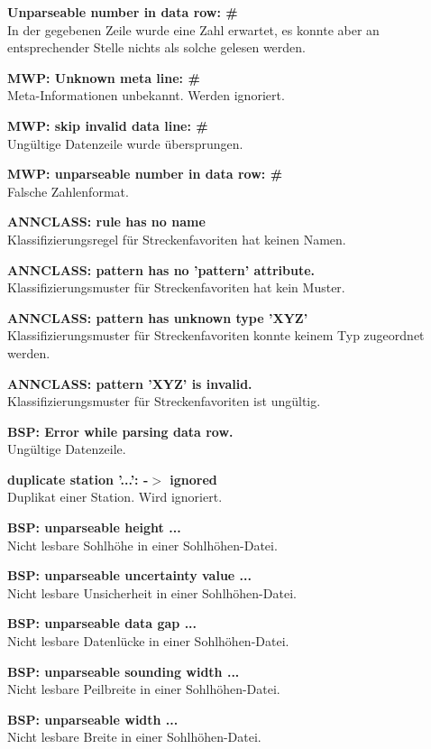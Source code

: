 \textbf{Unparseable number in data row: \#}
\\In der gegebenen Zeile wurde eine Zahl erwartet,
es konnte aber an entsprechender Stelle nichts als solche gelesen werden.

\textbf{MWP: Unknown meta line: \#}
\\Meta-Informationen unbekannt. Werden ignoriert.

\textbf{MWP: skip invalid data line: \#}
\\Ungültige Datenzeile wurde übersprungen.

\textbf{MWP: unparseable number in data row: \#}
\\Falsche Zahlenformat.

\textbf{ANNCLASS: rule has no name}
\\Klassifizierungsregel für Streckenfavoriten hat keinen Namen.

\textbf{ANNCLASS: pattern has no 'pattern' attribute.}
\\Klassifizierungsmuster für Streckenfavoriten hat kein Muster.

\textbf{ANNCLASS: pattern has unknown type 'XYZ'}
\\Klassifizierungsmuster für Streckenfavoriten konnte keinem Typ zugeordnet werden.

\textbf{ANNCLASS: pattern 'XYZ' is invalid.}
\\Klassifizierungsmuster für Streckenfavoriten ist ungültig.

\textbf{BSP: Error while parsing data row.}
\\Ungültige Datenzeile.

\textbf{duplicate station '...': -$>$ ignored}
\\Duplikat einer Station. Wird ignoriert.

\textbf{BSP: unparseable height ...}
\\Nicht lesbare Sohlhöhe in einer Sohlhöhen-Datei.

\textbf{BSP: unparseable uncertainty value ...}
\\Nicht lesbare Unsicherheit in einer Sohlhöhen-Datei.

\textbf{BSP: unparseable data gap ...}
\\Nicht lesbare Datenlücke in einer Sohlhöhen-Datei.

\textbf{BSP: unparseable sounding width ...}
\\Nicht lesbare Peilbreite in einer Sohlhöhen-Datei.

\textbf{BSP: unparseable width ...}
\\Nicht lesbare Breite in einer Sohlhöhen-Datei.

